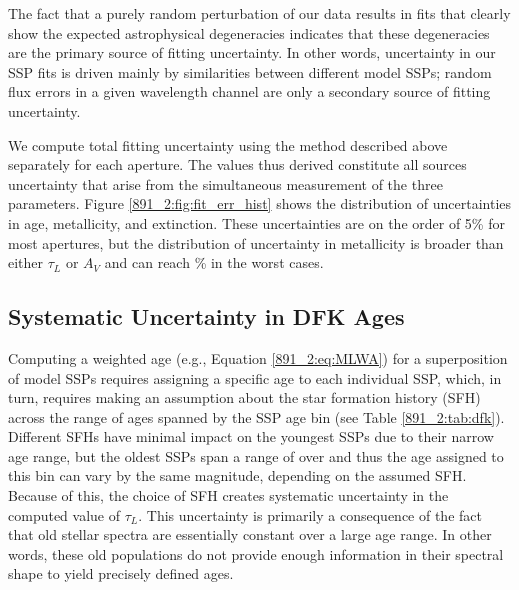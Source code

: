 
 
The fact that a purely random perturbation of our data results in fits
that clearly show the expected astrophysical degeneracies indicates
that these degeneracies are the primary source of fitting
uncertainty. In other words, uncertainty in our SSP fits is driven
mainly by similarities between different model SSPs; random flux
errors in a given wavelength channel are only a secondary source of
fitting uncertainty.



We compute total fitting uncertainty using the method described above
separately for each aperture. The values thus derived constitute all
sources uncertainty that arise from the simultaneous measurement of
the three parameters. Figure \ref{891_2:fig:fit_err_hist} shows the
distribution of uncertainties in age, metallicity, and
extinction. These uncertainties are on the order of 5\% for most
apertures, but the distribution of uncertainty in metallicity is
broader than either $\tau_L$ or $A_V$ and can reach \% in the
worst cases.



\subsection{Systematic Uncertainty in DFK Ages}
\label{891_2:sec:sys_err}

Computing a weighted age (e.g., Equation \ref{891_2:eq:MLWA}) for a
superposition of model SSPs requires assigning a specific age to each
individual SSP, which, in turn, requires making an assumption about
the star formation history (SFH) across the range of ages spanned by
the SSP age bin (see Table \ref{891_2:tab:dfk}). Different SFHs have
minimal impact on the youngest SSPs due to their narrow age range, but
the oldest SSPs span a range of over  and thus the age
assigned to this bin can vary by the same magnitude, depending on the
assumed SFH. Because of this, the choice of SFH creates systematic
uncertainty in the computed value of $\tau_L$. This uncertainty is
primarily a consequence of the fact that old stellar spectra are
essentially constant over a large age range. In other words, these old
populations do not provide enough information in their spectral shape
to yield precisely defined ages.

